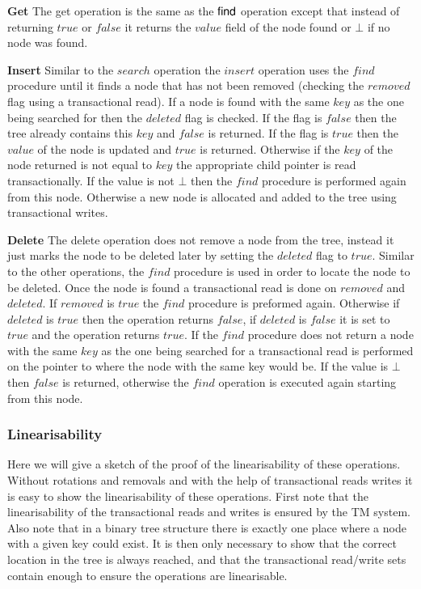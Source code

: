 \documentclass[10pt]{sigplanconf}
\begin{document}
{\bf Get} The get operation is the same as the ${\sf find}$ operation except that instead of returning $true$ or $false$ it returns the $value$ field of the node found or $\bot$ if no node was found.

{\bf Insert} Similar to the $search$ operation the $insert$ operation uses the $find$ procedure until it finds a node that has not been removed (checking the $removed$ flag using a transactional read).
If a node is found with the same $key$ as the one being searched for then the $deleted$ flag is checked.
If the flag is $false$ then the tree already contains this $key$ and $false$ is returned.
If the flag is $true$ then the $value$ of the node is updated and $true$ is returned.
Otherwise if the $key$ of the node returned is not equal to $key$ the appropriate child pointer is read transactionally.
If the value is not $\bot$ then the $find$ procedure is performed again from this node.
Otherwise a new node is allocated and added to the tree using transactional writes.

{\bf Delete} The delete operation does not remove a node from the tree, instead it just marks the node to be deleted later by setting the $deleted$ flag to $true$.
Similar to the other operations, the $find$ procedure is used in order to locate the node to be deleted.
Once the node is found a transactional read is done on $removed$ and $deleted$.
If $removed$ is $true$ the $find$ procedure is preformed again.
Otherwise if $deleted$ is $true$ then the operation returns $false$, if $deleted$ is $false$ it is set to $true$ and the operation returns $true$.
If the $find$ procedure does not return a node with the same $key$ as the one being searched for a transactional read is performed on the pointer to where the node with the same key would be.
If the value is $\bot$ then $false$ is returned, otherwise the $find$ operation is executed again starting from this node.

\subsubsection{Linearisability}
Here we will give a sketch of the proof of the linearisability of these operations.
Without rotations and removals and with the help of transactional reads writes it is easy to show the linearisability of these operations.
First note that the linearisability of the transactional reads and writes is ensured by the TM system.
Also note that in a binary tree structure there is exactly one place where a node with a given key could exist.
It is then only necessary to show that the correct location in the tree is always reached, and that the transactional read/write sets contain enough to ensure the operations are linearisable.
\end{document}
